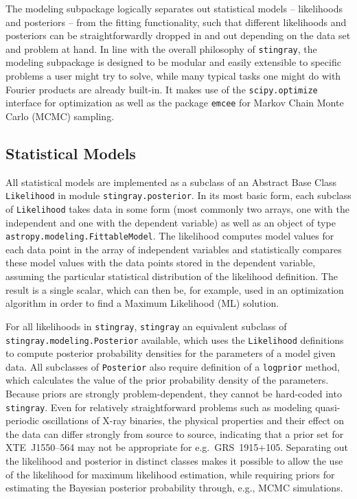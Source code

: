 \documentclass[twocolumn]{aastex62}
\newcommand{\stingray}{\texttt{stingray}\xspace}
\newcommand{\likelihood}{\texttt{Likelihood}\xspace}
\begin{document}
The modeling subpackage logically separates out statistical models -- likelihoods and posteriors -- from the fitting functionality, such that different likelihoods and posteriors can be straightforwardly dropped in and out depending on the data set and problem at hand. 
In line with the overall philosophy of \stingray, the modeling subpackage is designed to be modular and easily extensible to specific problems a user might try to solve, while many typical tasks one might do with Fourier products are already built-in. 
It makes use of the \verb|scipy.optimize| interface for optimization as well as the package \texttt{emcee} for Markov Chain Monte Carlo (MCMC) sampling.

\subsection{Statistical Models}

All statistical models are implemented as a subclass of an Abstract Base Class \likelihood in module \verb|stingray.posterior|. 
In its most basic form, each subclass of \likelihood takes data in some form (most commonly two arrays, one with the independent and one with the dependent variable) as well as an object of type \verb|astropy.modeling.FittableModel|. 
The likelihood computes model values for each data point in the array of independent variables and statistically compares these model values with the data points stored in the dependent variable, assuming the particular statistical distribution of the likelihood definition. 
The result is a single scalar, which can then be, for example, used in an optimization algorithm in order to find a Maximum Likelihood (ML) solution.

For all likelihoods in \stingray, \stingray an equivalent subclass of \verb|stingray.modeling.Posterior| available, which uses the \likelihood definitions to compute posterior probability densities for the parameters of a model given data. 
All subclasses of \verb|Posterior| also require definition of a \texttt{logprior} method, which calculates the value of the prior probability density of the parameters. 
Because priors are strongly problem-dependent, they cannot be hard-coded into \stingray. 
Even for relatively straightforward problems such as modeling quasi-periodic oscillations of X-ray binaries, the physical properties and their effect on the data can differ strongly from source to source, indicating that a prior set for XTE~J1550--564 may not be appropriate for e.g.~GRS~1915+105. 
Separating out the likelihood and posterior in distinct classes makes it possible to allow the use of the likelihood for maximum likelihood estimation, while requiring priors for estimating the Bayesian posterior probability through, e.g., MCMC simulations.
\end{document}
